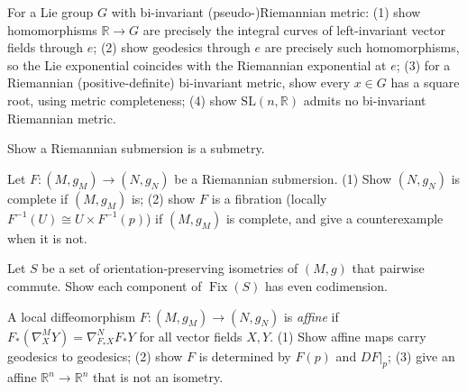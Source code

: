 \begin{remark}
  \label{rem:pet-ch5-ex-35}
  For a Lie group $G$ with bi-invariant (pseudo-)Riemannian metric: (1) show
  homomorphisms $\mathbb R\to G$ are precisely the integral curves of left-invariant
  vector fields through $e$; (2) show geodesics through $e$ are precisely such
  homomorphisms, so the Lie exponential coincides with the Riemannian exponential
  at $e$; (3) for a Riemannian (positive-definite) bi-invariant metric, show every
  $x\in G$ has a square root, using metric completeness; (4) show
  $\mathrm{SL}(n,\mathbb R)$ admits no bi-invariant Riemannian metric.
\end{remark}

\begin{remark}
  \label{rem:pet-ch5-ex-36}
  Show a Riemannian submersion is a submetry.
\end{remark}

\begin{remark}
  \label{rem:pet-ch5-ex-37}
  Let $F:(M,g_M)\to(N,g_N)$ be a Riemannian submersion. (1) Show $(N,g_N)$ is
  complete if $(M,g_M)$ is; (2) show $F$ is a fibration (locally
  $F^{-1}(U)\cong U\times F^{-1}(p)$) if $(M,g_M)$ is complete, and give a
  counterexample when it is not.
\end{remark}

\begin{remark}
  \label{rem:pet-ch5-ex-38}
  Let $S$ be a set of orientation-preserving isometries of $(M,g)$ that pairwise
  commute. Show each component of $\operatorname{Fix}(S)$ has even codimension.
\end{remark}

\begin{remark}
  \label{rem:pet-ch5-ex-39}
  A local diffeomorphism $F:(M,g_M)\to(N,g_N)$ is \emph{affine} if
  $F_*(\nabla^M_XY)=\nabla^N_{F_*X}F_*Y$ for all vector fields $X,Y$. (1) Show
  affine maps carry geodesics to geodesics; (2) show $F$ is determined by $F(p)$
  and $DF|_p$; (3) give an affine $\mathbb R^n\to\mathbb R^n$ that is not an
  isometry.
\end{remark}

